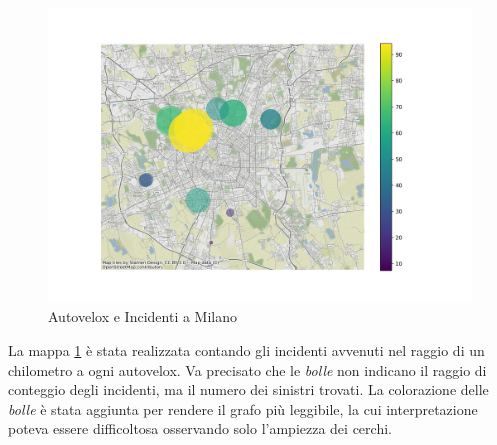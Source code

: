 \documentclass[a4paper]{report}
\newcommand{\quotestyle}[1]{\textit{#1}}
\begin{document}
\begin{figure}
    \includegraphics[width=\linewidth]{../src/autovelox/correlazione.png}
    \caption{Autovelox e Incidenti a Milano}
    \label{fig:autovelox-incidenti}
\end{figure}

La mappa \ref{fig:autovelox-incidenti} è stata realizzata contando gli incidenti avvenuti 
nel raggio di un chilometro a ogni autovelox.
Va precisato che le \quotestyle{bolle} non indicano il raggio di conteggio degli incidenti, ma 
il numero dei sinistri trovati. La colorazione delle \quotestyle{bolle} è stata aggiunta per 
rendere il grafo più leggibile, la cui interpretazione poteva essere difficoltosa 
osservando solo l'ampiezza dei cerchi.
\end{document}
